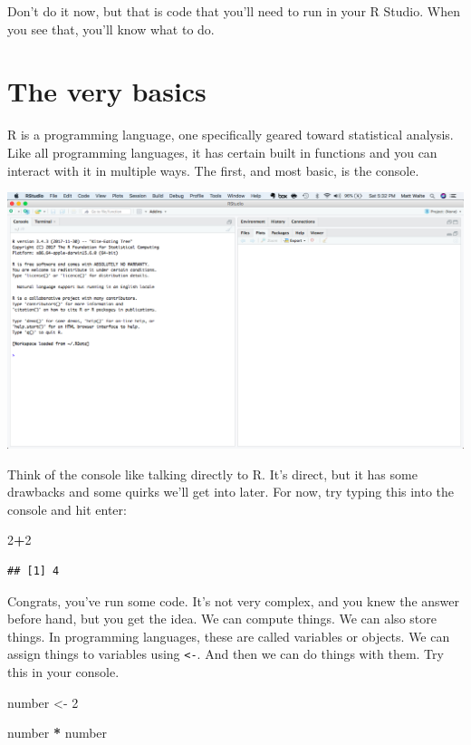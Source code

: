 \documentclass[]{book}
\newenvironment{Shaded}{\begin{snugshade}}{\end{snugshade}}
\newcommand{\DecValTok}[1]{\textcolor[rgb]{0.00,0.00,0.81}{#1}}
\newcommand{\StringTok}[1]{\textcolor[rgb]{0.31,0.60,0.02}{#1}}
\newcommand{\OperatorTok}[1]{\textcolor[rgb]{0.81,0.36,0.00}{\textbf{#1}}}
\newcommand{\NormalTok}[1]{#1}
\begin{document}
Don't do it now, but that is code that you'll need to run in your R
Studio. When you see that, you'll know what to do.

\chapter{The very basics}\label{Basics}

R is a programming language, one specifically geared toward statistical
analysis. Like all programming languages, it has certain built in
functions and you can interact with it in multiple ways. The first, and
most basic, is the console.

\includegraphics[width=18.97in]{images/verybasics1}

Think of the console like talking directly to R. It's direct, but it has
some drawbacks and some quirks we'll get into later. For now, try typing
this into the console and hit enter:

\begin{Shaded}
\begin{Highlighting}[]
\DecValTok{2}\OperatorTok{+}\DecValTok{2}
\end{Highlighting}
\end{Shaded}

\begin{verbatim}
## [1] 4
\end{verbatim}

Congrats, you've run some code. It's not very complex, and you knew the
answer before hand, but you get the idea. We can compute things. We can
also store things. In programming languages, these are called variables
or objects. We can assign things to variables using
\texttt{\textless{}-}. And then we can do things with them. Try this in
your console.

\begin{Shaded}
\begin{Highlighting}[]
\NormalTok{number <-}\StringTok{ }\DecValTok{2}

\NormalTok{number }\OperatorTok{*}\StringTok{ }\NormalTok{number}
\end{Highlighting}
\end{Shaded}
\end{document}

